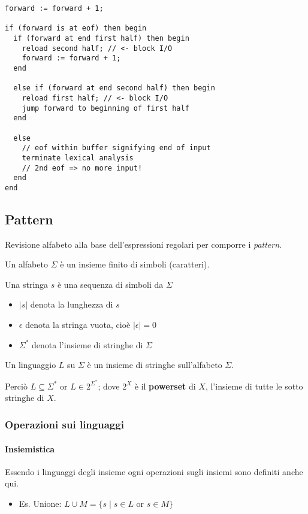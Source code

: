 \begin{lstlisting}[caption=Pseudo-codice implementazione Buffered I/O]
forward := forward + 1;

if (forward is at eof) then begin
  if (forward at end first half) then begin
    reload second half; // <- block I/O
    forward := forward + 1;
  end

  else if (forward at end second half) then begin
    reload first half; // <- block I/O
    jump forward to beginning of first half
  end

  else
    // eof within buffer signifying end of input
    terminate lexical analysis
    // 2nd eof => no more input!
  end
end
\end{lstlisting}

\subsection{Pattern}
Revisione alfabeto alla base dell'espressioni regolari per comporre i
\textit{pattern}.
\begin{definition}[Alphabet]
Un alfabeto $\Sigma$ è un insieme finito di simboli (caratteri).
\end{definition}
\begin{definition}[String]
Una stringa $s$ è una sequenza di simboli da $\Sigma$
\begin{itemize}
\item $|s|$ denota la lunghezza di $s$
\item $\epsilon$ denota la stringa vuota, cioè $|\epsilon| = 0$
\item $\Sigma^*$ denota l'insieme di stringhe di $\Sigma$
\end{itemize}
\end{definition}

\begin{definition}[Language]
Un linguaggio $L$ su $\Sigma$ è un insieme di stringhe sull'alfabeto $\Sigma$.
\end{definition}

Perciò $L \subseteq \Sigma^* \text{ or } L \in 2^{\Sigma^*}$; dove $2^X$ è il
\textbf{powerset} di $X$, l'insieme di tutte le sotto stringhe di $X$.

\subsubsection{Operazioni sui linguaggi}
\paragraph{Insiemistica}
Essendo i linguaggi degli insieme ogni operazioni sugli insiemi sono definiti
anche qui.
\begin{itemize}
\item Es. Unione: $L \cup M = \{s \mid s \in L \text{ or } s \in M\}$
\end{itemize}
